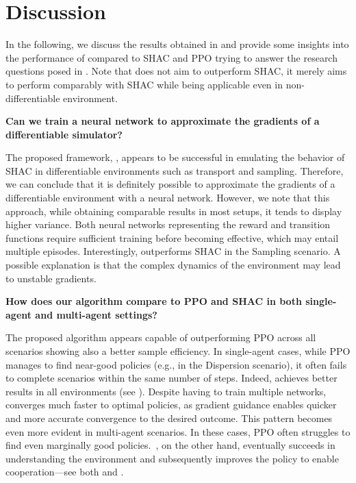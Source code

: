 \section{Discussion}
In the following, we discuss the results obtained in  and provide some insights into the performance of \fname{} compared to SHAC and PPO trying to answer the research questions posed in . Note that \fname{} does not aim to outperform SHAC, it merely aims to perform comparably with SHAC while being applicable even in non-differentiable environment. 
\begin{center}
 \textbf{Can we train a neural network to approximate the gradients of a differentiable simulator?}
\end{center}

The proposed framework, \fname{}, appears to be successful in emulating the behavior of SHAC in differentiable environments such as transport and sampling. Therefore, we can conclude that it is definitely possible to approximate the gradients of a differentiable environment with a neural network. However, we note that this approach, while obtaining comparable results in most setups, it tends to display higher variance. Both neural networks representing the reward and transition functions require sufficient training before becoming effective, which may entail multiple episodes. Interestingly, \fname{} outperforms SHAC in the Sampling scenario. A possible explanation is that the complex dynamics of the environment may lead to unstable gradients.

\begin{center}
 \textbf{How does our algorithm compare to PPO and SHAC in both single-agent and multi-agent settings?}
\end{center}
The proposed algorithm appears capable of outperforming PPO across all scenarios showing also a better sample efficiency. In single-agent cases, while PPO manages to find near-good policies (e.g., in the Dispersion scenario), it often fails to complete scenarios within the same number of steps. Indeed, \fname{} achieves better results in all environments (see ). Despite having to train multiple networks, \fname{} converges much faster to optimal policies, as gradient guidance enables quicker and more accurate convergence to the desired outcome. This pattern becomes even more evident in multi-agent scenarios. In these cases, PPO often struggles to find even marginally good policies.\ \fname{}, on the other hand, eventually succeeds in understanding the environment and subsequently improves the policy to enable cooperation---see both  and .

